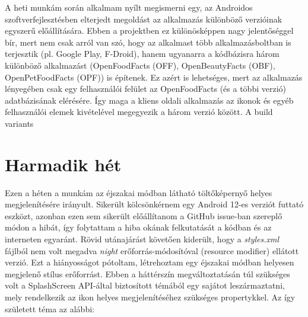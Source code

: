 A heti munkám során alkalmam nyílt megismerni egy, az Androidos szoftverfejlesztésben elterjedt
megoldást az alkalmazás különböző verzióinak egyszerű előállítására. Ebben a projektben ez
különösképpen nagy jelentőséggel bír, mert nem csak arról van szó, hogy az alkalmast több
alkalmazásboltban is terjesztik (pl. Google Play, F-Droid), hanem ugyanarra a kódbázisra
három különböző alkalmazást (OpenFoodFacts (OFF), OpenBeautyFacts (OBF), OpenPetFoodFacts (OPF)) %
is építenek. Ez azért is lehetséges, mert az alkalmazás lényegében csak egy felhasználói felület
az OpenFoodFacts (és a többi verzió) adatbázisának elérésére. Így maga a kliens oldali alkalmazás
az ikonok és egyéb felhasználói elemek kivételével megegyezik a három verzió között.
A build variants %


\section{Harmadik hét}
Ezen a héten a munkám az éjszakai módban látható töltőképernyő helyes megjelenítésére irányult.
Sikerült kölcsönkérnem egy Android 12-es verziót futtató eszközt, azonban ezen sem sikerült
előállítanom a GitHub issue-ban szereplő módon a hibát, így folytattam a hiba okának felkutatását
a kódban és az interneten egyaránt. Rövid utánajárást követően kiderült, hogy a
\textit{styles.xml} fájlból nem volt megadva \textit{night} erőforrás-módosítóval
(resource modifier) ellátott verzió. Ezt a hiányosságot pótoltam, létrehoztam egy éjszakai
módban helyesen megjelenő stílus erőforrást. Ebben a háttérszín megváltoztatásán túl szükséges
volt a SplashScreen API-által biztosított témából egy sajátot leszármaztatni, mely rendelkezik
az ikon helyes megjelenítéséhez szükséges propertykkel. Az így született téma az alábbi:

